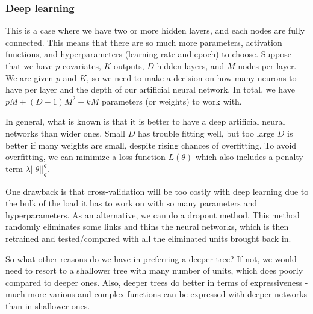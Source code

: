\documentclass[12pt]{article}
\theoremstyle{definition}
\theoremstyle{property}
\theoremstyle{assumption}
\theoremstyle{example}
\theoremstyle{comment}
\begin{document}
\subsubsection{Deep learning}
This is a case where we have two or more hidden layers, and each nodes are fully connected. This means that there are so much more parameters, activation functions, and hyperparameters (learning rate and epoch) to choose. Suppose that we have $p$ covariates, $K$ outputs, $D$ hidden layers, and $M$ nodes per layer. We are given $p$ and $K$, so we need to make a decision on how many neurons to have per layer and the depth of our artificial neural network. In total, we have $pM + (D-1)M^2 + kM$ parameters (or weights) to work with. \par
In general, what is known is that it is better to have a deep artificial neural networks than wider ones. Small $D$ has trouble fitting well, but too large $D$ is better if many weights are small, despite rising chances of overfitting. To avoid overfitting, we can minimize a loss function $L(\theta)$ which also includes a penalty term $\lambda ||\theta||_q^q$.

\par
 One drawback is that cross-validation will be too costly with deep learning due to the bulk of the load it has to work on with so many parameters and hyperparameters. As an alternative, we can do a dropout method. This method randomly eliminates some links and thins the neural networks, which is then retrained and tested/compared with all the eliminated units brought back in. 
\par
So what other reasons do we have in preferring a deeper tree? If not, we would need to resort to a shallower tree with many number of units, which does poorly compared to deeper ones. Also, deeper trees do better in terms of expressiveness - much more various and complex functions can be expressed with deeper networks than in shallower ones. 
\end{document}
